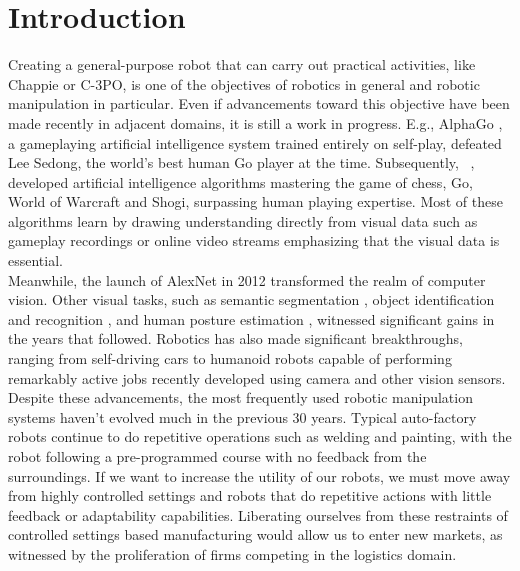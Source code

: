 \chapter{Introduction}

Creating a general-purpose robot that can carry out practical activities, like Chappie or C-3PO,
is one of the objectives of robotics in general and robotic manipulation in particular.
Even if advancements toward this objective have been made recently in adjacent domains, it is still a work in progress.
E.g., AlphaGo \cite{silver2018general}, a gameplaying artificial intelligence system trained entirely on self-play,
defeated Lee Sedong, the world's best human Go player at the time. Subsequently, \citeauthor{silver2016mastering}~\cite{silver2016mastering},
developed artificial intelligence algorithms mastering the game of chess, Go, World of Warcraft and Shogi, surpassing human playing expertise. Most of these
algorithms learn by drawing understanding directly from visual data such as gameplay recordings or online video streams emphasizing that the visual data is essential.
\\


Meanwhile, the launch of AlexNet \cite{krizhevsky2017imagenet} in 2012 transformed the realm of computer vision.
Other visual tasks, such as semantic segmentation \cite{long2015fully}, object identification and recognition \cite{he2017mask},
and human posture estimation \cite{guler2018densepose}, witnessed significant gains in the years that followed. Robotics has also made significant breakthroughs,
ranging from self-driving cars to humanoid robots capable of performing remarkably active jobs recently developed using camera and other vision sensors.\\

Despite these advancements, the most frequently used robotic manipulation systems haven't evolved much in the previous 30 years.
Typical auto-factory robots continue to do repetitive operations such as welding and painting, with the robot following a pre-programmed course with no feedback from the surroundings.
If we want to increase the utility of our robots, we must move away from highly controlled settings and robots that do repetitive actions with little feedback or adaptability capabilities.
Liberating ourselves from these restraints of controlled settings based manufacturing would allow us to enter new markets, as witnessed by the proliferation of firms \cite{sereact} competing in the logistics domain. \\

